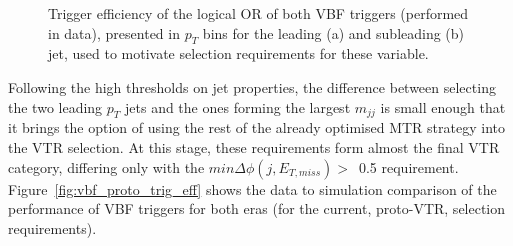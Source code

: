 \begin{figure}[htbp]
  \centering

  \caption{Trigger efficiency of the logical OR of both VBF triggers (performed in data), presented in $p_T$ bins for the leading (a) and subleading (b) jet, used to motivate selection requirements for these variable.}
  \label{fig:vbf_trig_pt_opt}
\end{figure}

\hspace{10pt} Following the high thresholds on jet properties, the difference between selecting the two leading $p_T$ jets and the ones forming the largest $m_{jj}$ is small enough that it brings the option of using the rest of the already optimised MTR strategy into the VTR selection. At this stage, these requirements form almost the final VTR category, differing only with the $min\Delta\phi(j, E_{T,miss})>$~0.5 requirement. Figure~\ref{fig:vbf_proto_trig_eff} shows the data to simulation comparison of the performance of VBF triggers for both eras (for the current, proto-VTR, selection requirements).

